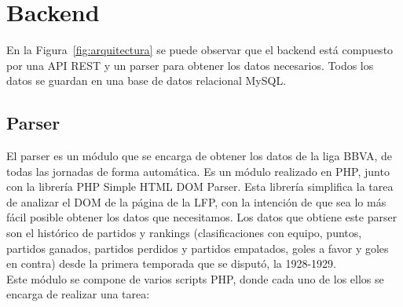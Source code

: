 \section{Backend}

En la Figura~\ref{fig:arquitectura} se puede observar que el backend está compuesto por una API REST y un parser para obtener los datos necesarios. Todos los datos se guardan en una base de datos relacional MySQL.

\subsection*{Parser}

El parser es un módulo que se encarga de obtener los datos de la liga BBVA, de todas las jornadas de forma automática. Es un módulo realizado en PHP, junto con la librería PHP Simple HTML DOM Parser. Esta librería simplifica la tarea de analizar el DOM de la página de la LFP, con la intención de que sea lo más fácil posible obtener los datos que necesitamos. Los datos que obtiene este parser son el histórico de partidos y rankings (clasificaciones con equipo, puntos, partidos ganados, partidos perdidos y partidos empatados, goles a favor y goles en contra) desde la primera temporada que se disputó, la 1928-1929.\\

Este módulo se compone de varios scripts PHP, donde cada uno de los ellos se encarga de realizar una tarea:

